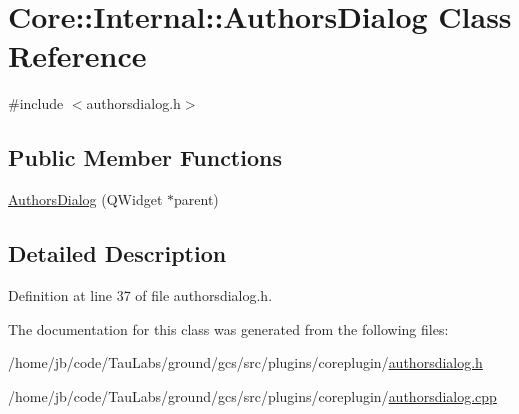\hypertarget{class_core_1_1_internal_1_1_authors_dialog}{\section{\-Core\-:\-:\-Internal\-:\-:\-Authors\-Dialog \-Class \-Reference}
\label{class_core_1_1_internal_1_1_authors_dialog}
}


{\ttfamily \#include $<$authorsdialog.\-h$>$}

\subsection*{\-Public \-Member \-Functions}
\begin{DoxyCompactItemize}
\item 
\hyperlink{group___core_plugin_ga8135a04d18c6e023051614472f4e6f9a}{\-Authors\-Dialog} (\-Q\-Widget $\ast$parent)
\end{DoxyCompactItemize}


\subsection{\-Detailed \-Description}


\-Definition at line 37 of file authorsdialog.\-h.



\-The documentation for this class was generated from the following files\-:\begin{DoxyCompactItemize}
\item 
/home/jb/code/\-Tau\-Labs/ground/gcs/src/plugins/coreplugin/\hyperlink{authorsdialog_8h}{authorsdialog.\-h}\item 
/home/jb/code/\-Tau\-Labs/ground/gcs/src/plugins/coreplugin/\hyperlink{authorsdialog_8cpp}{authorsdialog.\-cpp}\end{DoxyCompactItemize}
